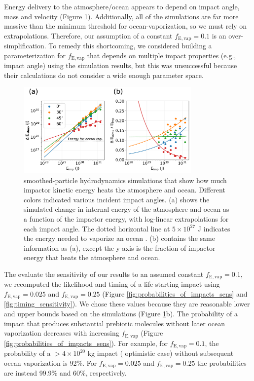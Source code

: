 \documentclass[preprint]{aastex63}
\begin{document}
Energy delivery to the atmosphere/ocean appears to depend on impact angle, mass and velocity (Figure \ref{fig:energy_for_ocean_vap}). Additionally, all of the \citet{Citron_2022} simulations are far more massive than the minimum threshold for ocean-vaporization, so we must rely on extrapolations. Therefore, our assumption of a constant $f_\mathrm{E,vap} = 0.1$ is an over-simplification. To remedy this shortcoming, we considered building a parameterization for $f_\mathrm{E,vap}$ that depends on multiple impact properties (e.g., impact angle) using the \citet{Citron_2022} simulation results, but this was unsuccessful because their calculations do not consider a wide enough parameter space.

\begin{figure}
  \centering
  \includegraphics[width=0.8\textwidth]{figures/energy_for_ocean_vap.pdf}
  \caption{\citet{Citron_2022} smoothed-particle hydrodynamics simulations that show how much impactor kinetic energy heats the atmosphere and ocean. Different colors indicated various incident impact angles. (a) shows the simulated change in internal energy of the atmosphere and ocean as a function of the impactor energy, with log-linear extrapolations for each impact angle. The dotted horizontal line at $5 \times 10^{27}$ J indicates the energy needed to vaporize an ocean \citep{Sleep_1989}. (b) contains the same information as (a), except the y-axis is the fraction of impactor energy that heats the atmosphere and ocean.}
  \label{fig:energy_for_ocean_vap}
\end{figure}

The evaluate the sensitivity of our results to an assumed constant $f_\mathrm{E,vap} = 0.1$, we recomputed the likelihood and timing of a life-starting impact using $f_\mathrm{E,vap} = 0.025$ and $f_\mathrm{E,vap} = 0.25$ (Figure \ref{fig:probabilities_of_impacts_sens} and \ref{fig:timing_sensitivity}). We chose these values because they are reasonable lower and upper bounds based on the \citet{Citron_2022} simulations (Figure \ref{fig:energy_for_ocean_vap}b). The probability of a impact that produces substantial prebiotic molecules without later ocean vaporization decreases with increasing $f_\mathrm{E,vap}$ (Figure \ref{fig:probabilities_of_impacts_sens}). For example, for $f_\mathrm{E,vap} = 0.1$, the probability of a $>4 \times 10^{20}$ kg impact (\citet{Wogan_2023} optimistic case) without subsequent ocean vaporization is 92\%. For $f_\mathrm{E,vap} = 0.025$ and $f_\mathrm{E,vap} = 0.25$ the probabilities are instead 99.9\% and 60\%, respectively.
\end{document}
